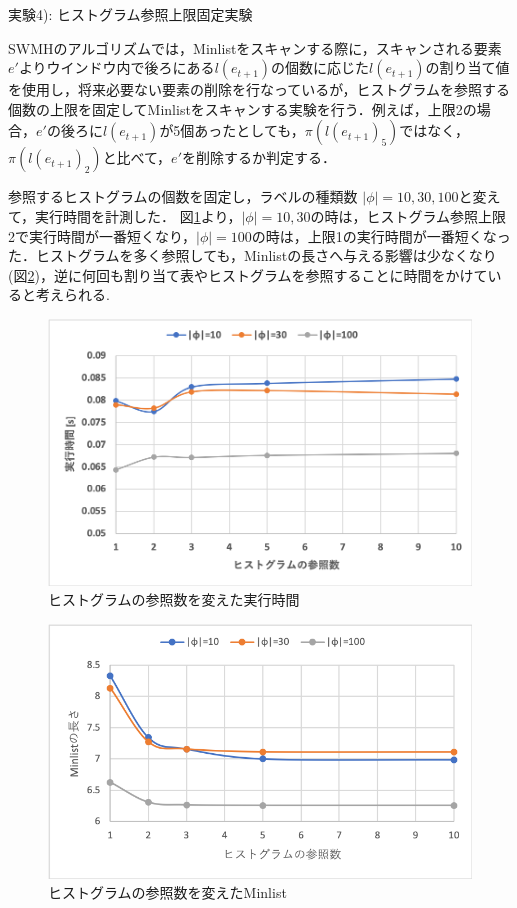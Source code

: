 実験4): ヒストグラム参照上限固定実験

SWMHのアルゴリズムでは，Minlistをスキャンする際に，スキャンされる要素$e'$よりウインドウ内で後ろにある$l(e_{t+1})$の個数に応じた$l(e_{t+1})$の割り当て値を使用し，将来必要ない要素の削除を行なっているが，ヒストグラムを参照する個数の上限を固定してMinlistをスキャンする実験を行う．例えば，上限2の場合，$e'$の後ろに$l(e_{t+1})$が5個あったとしても，$\pi(l(e_{t+1})_{5})$ではなく，$\pi(l(e_{t+1})_{2})$と比べて，$e'$を削除するか判定する．


参照するヒストグラムの個数を固定し，ラベルの種類数 $| \phi | = 10,30,100$と変えて，実行時間を計測した．
図\ref{fig:fix}より，$|\phi| = 10,30$の時は，ヒストグラム参照上限2で実行時間が一番短くなり，$|\phi| = 100$の時は，上限1の実行時間が一番短くなった．ヒストグラムを多く参照しても，Minlistの長さへ与える影響は少なくなり(図\ref{fig:fix_ML})，逆に何回も割り当て表やヒストグラムを参照することに時間をかけていると考えられる.

 \begin{figure}[h]
  \centering
  \includegraphics[width=14cm]{jikken_fix.png}
    \caption{ヒストグラムの参照数を変えた実行時間}
    \label{fig:fix}
\end{figure}

 \begin{figure}[h]
  \centering
  \includegraphics[width=14cm]{jikken_fix_ML.png}
    \caption{ヒストグラムの参照数を変えたMinlist}
    \label{fig:fix_ML}
\end{figure}

